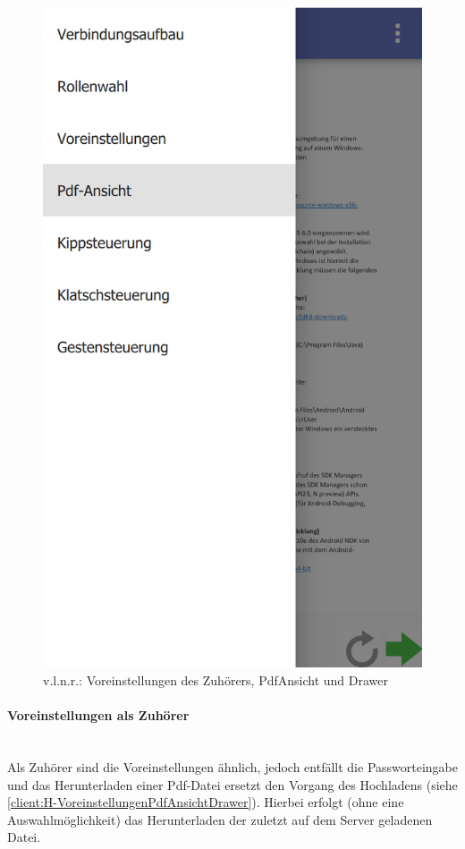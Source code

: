 \begin{figure}[ht!]
\begin{minipage}{0.31\linewidth}
		\includegraphics[scale=0.5]{GUI/Bilder/6-Menu-Button-Drawer-mit-Listview.PNG}
	\end{minipage}
	\caption{v.l.n.r.: Voreinstellungen des Zuhörers, PdfAnsicht und Drawer{\tiny}}
	\label{client:H-VoreinstellungenPdfAnsichtDrawer}
\end{figure}

\paragraph{Voreinstellungen als Zuhörer}$\;$\\
Als Zuhörer sind die Voreinstellungen ähnlich, jedoch entfällt die Passworteingabe und das Herunterladen einer Pdf-Datei ersetzt den Vorgang des Hochladens (siehe \autoref{client:H-VoreinstellungenPdfAnsichtDrawer}). Hierbei erfolgt (ohne eine Auswahlmöglichkeit) das Herunterladen der zuletzt auf dem Server geladenen Datei.

